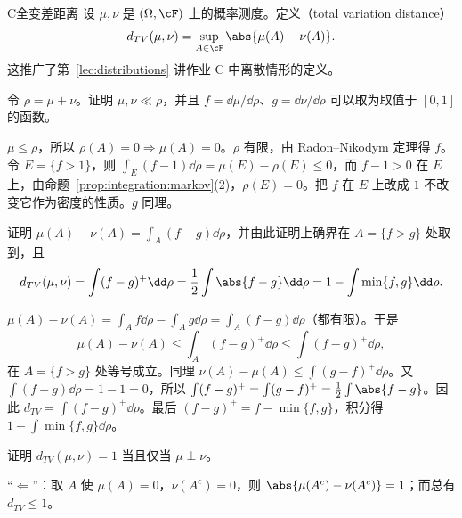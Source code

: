 \begin{probleme}{C}{全变差距离}
设 $\mu,\nu$ 是 $(\Omega,\cF)$ 上的概率测度。定义（total variation distance）
\[
d_{TV}(\mu,\nu)=\sup_{A\in\cF}\abs{\mu(A)-\nu(A)}.
\]
这推广了第~\ref{lec:distributions} 讲作业 C 中离散情形的定义。
\begin{questions}
\item 令 $\rho=\mu+\nu$。证明 $\mu,\nu\ll\rho$，并且 $f=\dd\mu/\dd\rho$、$g=\dd\nu/\dd\rho$ 可以取为取值于 $[0,1]$ 的函数。
\begin{solution}
$\mu\leqslant\rho$，所以 $\rho(A)=0\Rightarrow\mu(A)=0$。$\rho$ 有限，由 Radon--Nikodym 定理得 $f$。令 $E=\{f>1\}$，则 $\int_E(f-1)\dd\rho=\mu(E)-\rho(E)\leqslant0$，而 $f-1>0$ 在 $E$ 上，由命题~\ref{prop:integration:markov}(2)，$\rho(E)=0$。把 $f$ 在 $E$ 上改成 $1$ 不改变它作为密度的性质。$g$ 同理。
\end{solution}
\item 证明 $\mu(A)-\nu(A)=\int_A(f-g)\dd\rho$，并由此证明上确界在 $A=\{f>g\}$ 处取到，且
\[
d_{TV}(\mu,\nu)=\int(f-g)^+\dd\rho=\frac12\int\abs{f-g}\dd\rho=1-\int\min\{f,g\}\dd\rho .
\]
\begin{solution}
$\mu(A)-\nu(A)=\int_Af\dd\rho-\int_Ag\dd\rho=\int_A(f-g)\dd\rho$（都有限）。于是
\[
\mu(A)-\nu(A)\leqslant\int_A(f-g)^+\dd\rho\leqslant\int(f-g)^+\dd\rho,
\]
在 $A=\{f>g\}$ 处等号成立。同理 $\nu(A)-\mu(A)\leqslant\int(g-f)^+\dd\rho$。又 $\int(f-g)\dd\rho=1-1=0$，所以 $\int(f-g)^+=\int(g-f)^+=\frac12\int\abs{f-g}$。因此 $d_{TV}=\int(f-g)^+\dd\rho$。最后 $(f-g)^+=f-\min\{f,g\}$，积分得 $1-\int\min\{f,g\}\dd\rho$。
\end{solution}
\item 证明 $d_{TV}(\mu,\nu)=1$ 当且仅当 $\mu\perp\nu$。
\begin{solution}
“$\Leftarrow$”：取 $A$ 使 $\mu(A)=0$，$\nu(A^c)=0$，则 $\abs{\mu(A^c)-\nu(A^c)}=1$；而总有 $d_{TV}\leqslant1$。


\end{solution}
\end{questions}
\end{probleme}
